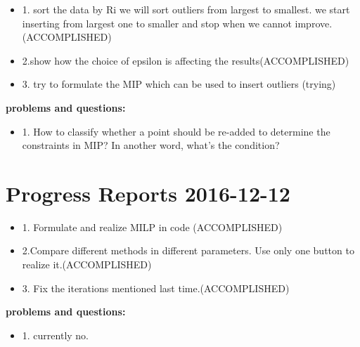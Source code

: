 \documentclass[]{article}
\begin{document}
\begin{itemize}
\item 1.  sort the data by Ri we will sort outliers from largest to smallest.
we start inserting from largest one to smaller and stop when we cannot improve. (ACCOMPLISHED)

\item 2.show how the choice of epsilon is affecting the results(ACCOMPLISHED)

\item 3. try to formulate the MIP which can be used to insert outliers (trying)


\end{itemize}
{\bf problems and questions:}
\begin{itemize}
\item 1. How to classify whether a point should be re-added to determine the constraints in MIP? In another word, what's the condition?


\end{itemize}

\newpage

\section{Progress Reports 2016-12-12}




\begin{itemize}
\item 1.  Formulate and realize MILP in code (ACCOMPLISHED)

\item 2.Compare different methods in different parameters. Use only one button to realize it.(ACCOMPLISHED)

\item 3. Fix the iterations mentioned last time.(ACCOMPLISHED)



\end{itemize}
{\bf problems and questions:}
\begin{itemize}
\item 1. currently no.



\end{itemize}
\end{document}
